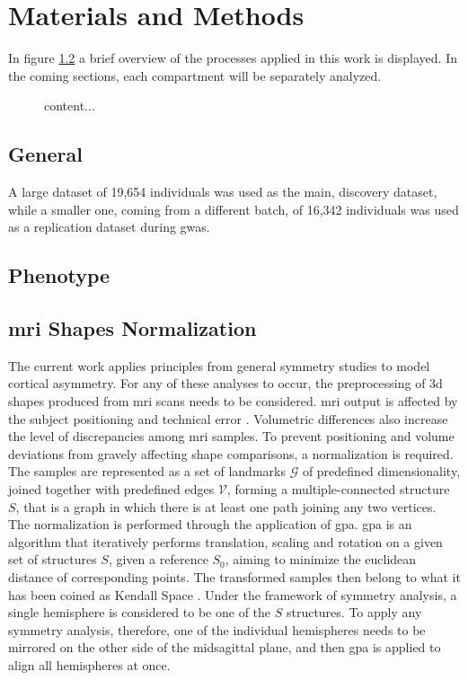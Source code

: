 \chapter{Materials and Methods}\label{chap:mat_and_methods}
In figure \ref{} a brief overview of the processes applied in this work is displayed. In the coming sections, each compartment will be separately analyzed.

\begin{figure}
	content...
\end{figure}



\section{General}

A large dataset of 19,654 individuals was used as the main, discovery dataset, while a smaller one, coming from a different batch, of 16,342 individuals was used as a replication dataset during \ac{gwas}.
\section{Phenotype}
\section{\Ac{mri} Shapes Normalization}\label{subsec:shape_normalization}
The current work applies principles from general symmetry studies to model cortical asymmetry. For any of these analyses to occur, the preprocessing of \ac{3d} shapes produced from \ac{mri} scans needs to be considered. \Ac{mri} output is affected by the subject positioning and technical error \cite{Wittens2021}.  Volumetric differences also increase the level of discrepancies among \ac{mri} samples.  To prevent positioning and volume deviations from gravely affecting shape comparisons, a normalization is required\cite{Klingenberg2020}. The samples are represented as a set of landmarks $\mathcal{G}$ of predefined dimensionality, joined together with predefined edges $\mathcal{V}$, forming a multiple-connected structure $S$, that is a graph in which there is at least one path joining any two vertices. The normalization is performed through the application of \ac{gpa}. \Ac{gpa} is an algorithm that iteratively performs translation, scaling and rotation on a given set of structures $S$, given a reference $S_0$, aiming to minimize the euclidean distance of corresponding points. The transformed samples then belong to what it has been coined as Kendall Space \cite{Klingenberg2020}. Under the framework of symmetry analysis, a single hemisphere is considered to be one of the $S$ structures. To apply any symmetry analysis, therefore, one of the individual hemispheres needs to be mirrored on the other side of the midsagittal plane, and then \ac{gpa} is applied to align all hemispheres at once.

